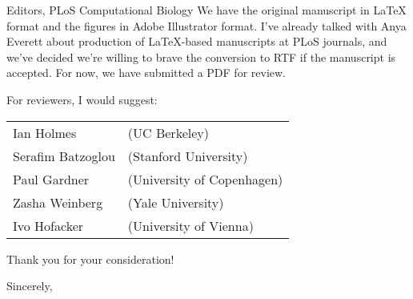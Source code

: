 \documentclass{jfrcletter}
\begin{document}
\begin{letter}{Editors, PLoS Computational Biology}
We have the original manuscript in LaTeX format and the figures in
Adobe Illustrator format. I've already talked with Anya Everett about
production of LaTeX-based manuscripts at PLoS journals, and we've
decided we're willing to brave the conversion to RTF if the manuscript
is accepted. For now, we have submitted a PDF for review.

For reviewers, I would suggest:

\vspace{1em}
\begin{tabular}{ll}
   Ian Holmes        & (UC Berkeley)\\
   Serafim Batzoglou & (Stanford University)\\
   Paul Gardner      & (University of Copenhagen)\\
   Zasha Weinberg    & (Yale University)\\
   Ivo Hofacker      & (University of Vienna)\\
\end{tabular}
\vspace{1em}

Thank you for your consideration!

\closing{Sincerely,}

\end{letter}
\end{document}
